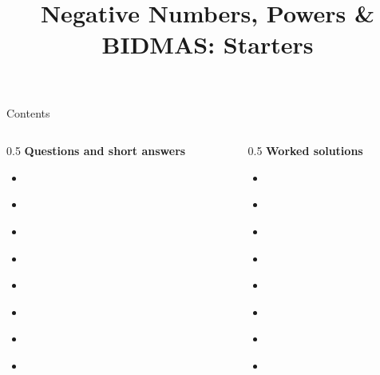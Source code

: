 \documentclass{beamer}
\title{Negative Numbers, Powers \& BIDMAS: Starters}
\author{}
\date{}
\begin{document}
\frame{\titlepage}

\begin{frame}{Contents}
\small
\begin{columns}[T]
\begin{column}{0.5\textwidth}
\textbf{Questions and short answers}
\begin{itemize}
\item \hyperlink{q-st1}{}
\item \hyperlink{q-st2}{}
\item \hyperlink{q-st3}{}
\item \hyperlink{q-st4}{}
\item \hyperlink{q-st5}{}
\item \hyperlink{q-st6}{}
\item \hyperlink{q-st7}{}
\item \hyperlink{q-st8}{}
\end{itemize}
\end{column}
\begin{column}{0.5\textwidth}
\textbf{Worked solutions}
\begin{itemize}
\item \hyperlink{work-st1}{}
\item \hyperlink{work-st2}{}
\item \hyperlink{work-st3}{}
\item \hyperlink{work-st4}{}
\item \hyperlink{work-st5}{}
\item \hyperlink{work-st6}{}
\item \hyperlink{work-st7}{}
\item \hyperlink{work-st8}{}
\end{itemize}
\end{column}
\end{columns}
\end{frame}
\end{document}
